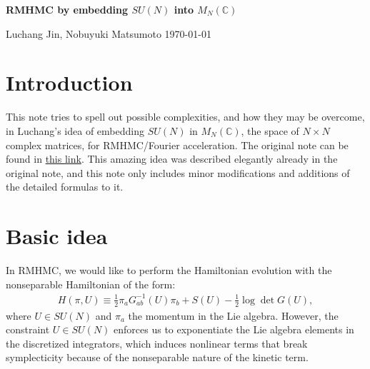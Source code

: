 \documentclass[12pt]{article}
\begin{document}

\begin{center}
  {\Large \bf
    RMHMC by embedding $SU(N)$
    into $M_N(\mathbb{C})$
  }
  \vspace{1.0cm}

  \centerline{
    Luchang Jin,
    Nobuyuki Matsumoto
    { \today }%
  }


\end{center}



\tableofcontents
\setcounter{footnote}{0}


\section{Introduction}
\label{sec:intro}

This note tries to spell out possible complexities,
and how they may be overcome,
in Luchang's idea of
embedding $SU(N)$ in $M_N(\mathbb{C})$,
the space of $N\times N$ complex matrices,
for RMHMC/Fourier acceleration.
The original note can be found in
\href{https://rbc.phys.columbia.edu/rbc_ukqcd/individual_postings/luchang/notes/2024-07-11-rmhmc-alg/note-v4.html}{this link}.
This amazing idea was described elegantly already in the original note,
and this note only includes minor modifications and additions of the detailed formulas to it.


\section{Basic idea}
\label{sec:idea}

In RMHMC, we would like to perform the Hamiltonian evolution with the
nonseparable Hamiltonian of the form:
\begin{align}
  H(\pi, U) \equiv \frac{1}{2} \pi_a G_{ab}^{-1}(U) \pi_b + S(U)
  - \frac{1}{2} \log \det G(U),
\end{align}
where $U \in SU(N)$ and $\pi_a$ the momentum in the Lie algebra.
However, the constraint $U \in SU(N)$
enforces us to exponentiate the Lie algebra elements
in the discretized integrators,
which induces nonlinear terms that break symplecticity
because of the nonseparable nature of the kinetic term.
\end{document}
